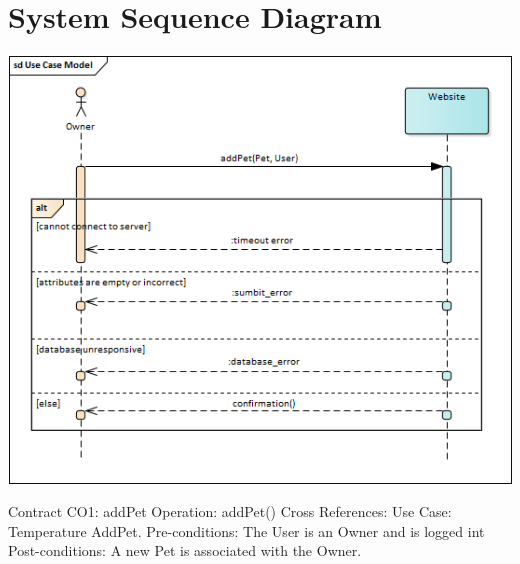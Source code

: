 \documentclass[12pt]{article}
\begin{document}
\section*{System Sequence Diagram}

\includegraphics[scale=.7]{SSD}

Contract CO1: addPet\newline 
Operation: addPet()\newline 
Cross References: Use Case: Temperature AddPet.\newline 
Pre-conditions: The User is an Owner and is logged int\newline 
Post-conditions: A new Pet is associated with the Owner.\newline 
\end{document}
